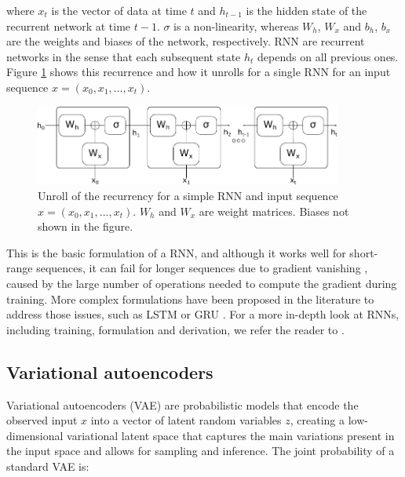 where $x_t$ is the vector of data at time $t$ and $h_{t-1}$ is the hidden state of the recurrent network at time $t-1$. $\sigma$ is a non-linearity, whereas $W_h$, $W_x$ and $b_h$, $b_x$ are the weights and biases of the network, respectively. RNN are recurrent networks in the sense that each subsequent state $h_t$ depends on all previous ones. Figure \ref{fig:rnnvae:rnn} shows this recurrence and how it unrolls for a single RNN for an input sequence $x = (x_0,x_1, ..., x_t)$. \\

\begin{figure}[!htbp]
  \centering
  \includegraphics[width=0.9\textwidth]{figures/rnnvae/rnn-fig.pdf}
  \caption[Unroll of the recurrency for a basic RNN.]{Unroll of the recurrency for a simple RNN and input sequence $x = (x_0,x_1, ..., x_t)$. $W_h$ and $W_x$ are weight matrices. Biases not shown in the figure.}\label{fig:rnnvae:rnn}
\end{figure}

This is the basic formulation of a RNN, and although it works well for short-range sequences, it can fail for longer sequences due to gradient vanishing \cite{Hochreiter1998}, caused by the large number of operations needed to compute the gradient during training. More complex formulations have been proposed in the literature to address those issues, such as LSTM \cite{Hochreiter1997} or GRU \cite{Chung2014}. For a more in-depth look at RNNs, including training, formulation and derivation, we refer the reader to \cite{Sherstinsky2020}.  \\

\subsection{Variational autoencoders}

Variational autoencoders (VAE) are probabilistic models that encode the observed input $x$ into a vector of latent random variables $z$, creating a low-dimensional variational latent space that captures the main variations present in the input space and allows for sampling and inference. The joint probability of a standard VAE is:

